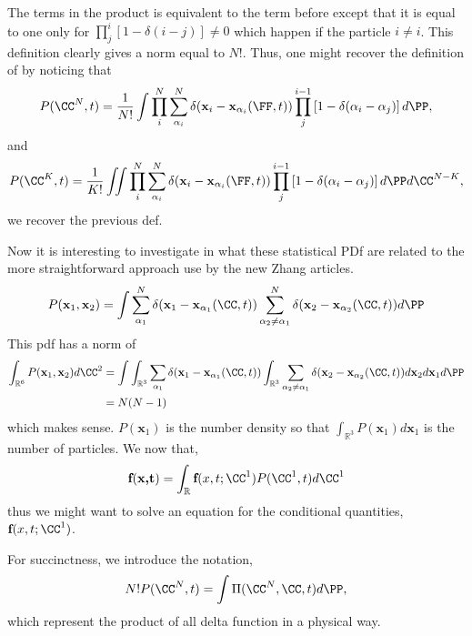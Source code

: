 The terms in the product is equivalent to the term before except that it is equal to one only for $\prod_j^i  [1 - \delta(i-j)] \neq 0$ which happen if the particle $i\neq i$. 
This definition clearly gives a norm equal to $N!$. 
Thus, one might recover the definition of \citet{zhang1994averaged} by noticing that
\begin{equation*}
    P(\CC^N,t)
    = \frac{1}{N!}\int 
    \prod_i^N
    \sum_{\alpha_i}^{N}\delta(\textbf{x}_i - \textbf{x}_{\alpha_i}(\FF,t))
    \prod_j^{i-1}\left[1 -  \delta(\alpha_i-\alpha_j)\right]
    d\PP,
\end{equation*}
and 
\begin{equation*}
    P(\CC^{K},t)
    = \frac{1}{K!}\iint 
    \prod_i^N
    \sum_{\alpha_i}^{N}\delta(\textbf{x}_i - \textbf{x}_{\alpha_i}(\FF,t))
    \prod_j^{i-1}\left[1 -  \delta(\alpha_i-\alpha_j)\right]
    d\PP d\CC^{N - K},
\end{equation*}
we recover the previous def. 

Now it is interesting to investigate in what these statistical PDf are related to the more straightforward approach use by the new Zhang articles. 
\begin{equation}
    P(\textbf{x}_1,\textbf{x}_2)
    = \int 
    \sum_{\alpha_1}^N\delta(\textbf{x}_1 - \textbf{x}_{\alpha_1}(\CC,t))
    \sum_{\alpha_2\neq \alpha_1}^N\delta(\textbf{x}_2 - \textbf{x}_{\alpha_2}(\CC,t))
    d\PP
\end{equation}
This pdf has a norm of 
\begin{align*}
    \int_{\mathbb{R}^6} P(\textbf{x}_1,\textbf{x}_2) d\CC^2
    &= \int 
    \int_{\mathbb{R}^3}
    \sum_{\alpha_1}\delta(\textbf{x}_1 - \textbf{x}_{\alpha_1}(\CC,t))
    \int_{\mathbb{R}^3}
    \sum_{\alpha_2\neq \alpha_1}\delta(\textbf{x}_2 - \textbf{x}_{\alpha_2}(\CC,t))
    d\textbf{x}_2 d \textbf{x}_1 
    d\PP\\
    &= N(N-1)
\end{align*}
which makes sense. $P(\textbf{x}_1)$ is the number density so that $\int_{\mathbb{R}^3} P(\textbf{x}_1) d\textbf{x}_1$ is the number of particles. 
We now that,
\begin{equation*}
    \textbf{f}(\textbf{x,t})
    = \int_{\mathbb{R}}
    \textbf{f}(x,t;\CC^1) 
    P(\CC^1,t)
    d\CC^1
\end{equation*}
thus we might want to solve an equation for the conditional quantities, $\textbf{f}(x,t;\CC^1)$. 

For succinctness, we introduce the notation, 
\begin{equation*}
    N! P(\CC^N,t)
    =\int 
    \Pi(\CC^N, \CC,t)
    d\PP,
\end{equation*}
which represent the product of all delta function in a physical way. 

